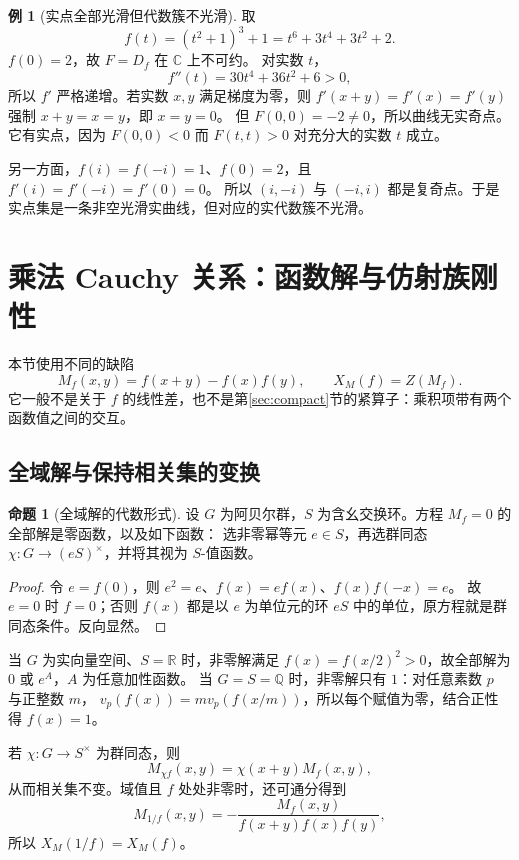 \documentclass[UTF8,11pt,a4paper]{ctexart}
\theoremstyle{definition}
\newtheorem{proposition}[theorem]{命题}
\newtheorem{example}[theorem]{例}
\newcommand{\Q}{\mathbb Q}
\newcommand{\R}{\mathbb R}
\newcommand{\C}{\mathbb C}
\begin{document}
\begin{example}[实点全部光滑但代数簇不光滑]\label{ex:smoothcounter}
取
\[
 f(t)=(t^2+1)^3+1=t^6+3t^4+3t^2+2.
\]
$f(0)=2$，故 $F=D_f$ 在 $\C$ 上不可约。
对实数 $t$，
\[
 f''(t)=30t^4+36t^2+6>0,
\]
所以 $f'$ 严格递增。若实数 $x,y$ 满足梯度为零，则
$f'(x+y)=f'(x)=f'(y)$ 强制 $x+y=x=y$，即 $x=y=0$。
但 $F(0,0)=-2\ne0$，所以曲线无实奇点。
它有实点，因为 $F(0,0)<0$ 而 $F(t,t)>0$ 对充分大的实数 $t$ 成立。

另一方面，$f(i)=f(-i)=1$、$f(0)=2$，且 $f'(i)=f'(-i)=f'(0)=0$。
所以 $(i,-i)$ 与 $(-i,i)$ 都是复奇点。于是实点集是一条非空光滑实曲线，但对应的实代数簇不光滑。
\end{example}

\section{乘法 Cauchy 关系：函数解与仿射族刚性}\label{sec:multiplicative}
本节使用不同的缺陷
\[
 M_f(x,y)=f(x+y)-f(x)f(y),\qquad X_M(f)=Z(M_f).
\]
它一般不是关于 $f$ 的线性差，也不是第\ref{sec:compact}节的紧算子：乘积项带有两个函数值之间的交互。

\subsection{全域解与保持相关集的变换}
\begin{proposition}[全域解的代数形式]
设 $G$ 为阿贝尔群，$S$ 为含幺交换环。方程 $M_f=0$ 的全部解是零函数，以及如下函数：
选非零幂等元 $e\in S$，再选群同态
$\chi:G\to(eS)^\times$，并将其视为 $S$-值函数。
\end{proposition}
\begin{proof}
令 $e=f(0)$，则 $e^2=e$、$f(x)=ef(x)$、$f(x)f(-x)=e$。
故 $e=0$ 时 $f=0$；否则 $f(x)$ 都是以 $e$ 为单位元的环 $eS$ 中的单位，原方程就是群同态条件。反向显然。
\end{proof}
当 $G$ 为实向量空间、$S=\R$ 时，非零解满足 $f(x)=f(x/2)^2>0$，故全部解为 $0$ 或 $e^A$，$A$ 为任意加性函数。
当 $G=S=\Q$ 时，非零解只有 $1$：对任意素数 $p$ 与正整数 $m$，
$v_p(f(x))=m v_p(f(x/m))$，所以每个赋值为零，结合正性得 $f(x)=1$。

若 $\chi:G\to S^\times$ 为群同态，则
\[
 M_{\chi f}(x,y)=\chi(x+y)M_f(x,y),
\]
从而相关集不变。域值且 $f$ 处处非零时，还可通分得到
\[
 M_{1/f}(x,y)=-\frac{M_f(x,y)}{f(x+y)f(x)f(y)},
\]
所以 $X_M(1/f)=X_M(f)$。
\end{document}
